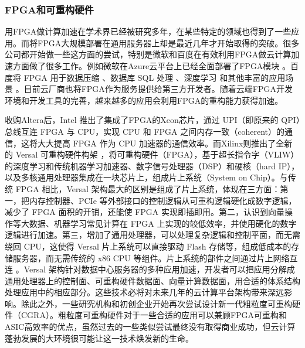 \subsubsection{FPGA和可重构硬件}

用FPGA做计算加速在学术界已经被研究多年，在某些特定的领域也得到了一些应用。而将FPGA大规模部署在通用服务器上却是最近几年才开始取得的突破。很多公司都开始做一些这方面的尝试，特别是微软和百度在有效利用FPGA做云计算加速方面做了很多工作。例如微软在Azure云平台上已经全面部署了FPGA模块 \cite{putnam2014reconfigurable,caulfield2016cloud}。百度将 FPGA 用于数据压缩 \cite{ouyang2010fpga}、数据库 SQL 处理 \cite{baidu-fpga-sql}、深度学习 \cite{ouyang2014sda} 和其他丰富的应用场景 \cite{ouyang2017xpu}。目前云厂商也将FPGA作为服务提供给第三方开发者。随着云端FPGA开发环境和开发工具的完善，越来越多的应用会利用FPGA的重构能力获得加速。

收购Altera后，Intel 推出了集成了FPGA的Xeon芯片，通过 UPI（即原来的 QPI）总线互连 FPGA 与 CPU，实现 CPU 和 FPGA 之间内存一致（coherent）的通信，这将大大提高 FPGA 作为 CPU 加速器的通信效率。而Xilinx则推出了全新的 Versal 可重构硬件构架 \cite{vissers2018keynote,vissers2019versal,gaide2019xilinx}，将可重构硬件（FPGA），基于超长指令字（VLIW）的深度学习和传统机器学习加速器、数字信号处理器（DSP）和硬核（hard IP），以及多核通用处理器集成在一块芯片上，组成片上系统（System on Chip）。与传统 FPGA 相比，Versal 架构最大的区别是组成了片上系统，体现在三方面：第一，把内存控制器、PCIe 等外部接口的控制逻辑从可重构逻辑硬化成数字逻辑，减少了 FPGA 面积的开销，还能使 FPGA 实现即插即用。第二，认识到向量操作等大数据、机器学习常见计算在 FPGA 上实现的较低效率，并使用硬化的数字逻辑进行加速。第三，增加了通用处理器，可以处理复杂逻辑和控制平面，而无需绕回 CPU，这使得 Versal 片上系统可以直接驱动 Flash 存储等，组成低成本的存储服务器，而无需传统的 x86 CPU 等组件。片上系统的部件之间通过片上网络互连 \cite{swarbrick2019network,gaide2019xilinx}。Versal 架构针对数据中心服务器的多种应用加速，开发者可以把应用分解成通用处理器上的控制面、可重构硬件数据面、向量计算数据面，用合适的体系结构处理应用中的相应部分。这些技术必将对未来几年的云计算平台架构带来深远影响。除此之外，一些研究机构和初创企业开始再次尝试设计新一代粗粒度可重构硬件（CGRA）。粗粒度可重构硬件对于一些合适的应用可以兼顾FPGA可重构和ASIC高效率的优点，虽然过去的一些类似尝试最终没有取得商业成功，但云计算蓬勃发展的大环境很可能让这一技术焕发新的生命。


